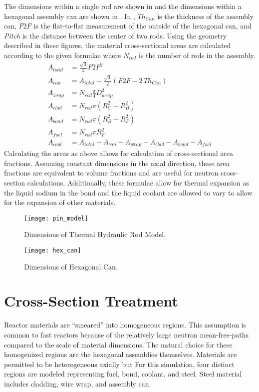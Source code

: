   The dimensions within a single rod are shown in  and the
  dimensions within a hexagonal assembly can are shown in . In
  , $T\!h_{Can}$ is the thickness of the assembly can,
  $F\!2\!F$ is the flat-to-flat measurement of the outside of the hexagonal can,
  and \textit{Pitch} is the distance between the center of two rods.
  Using the geometry described in 
  these figures, the material cross-sectional areas are calculated according to 
  the given formulae where $N_{rod}$ is the number of rods in the assembly.
  \begin{align}
    \label{eq:afrac_first}
    A_{total} &= \frac{\sqrt{3}}{2} F\!2\!F^2 \\
    A_{can} &= A_{total} - 
      \frac{\sqrt{3}}{2} \left(  F\!2\!F - 2 \, T\!h_{Can} \right) \\
    A_{wrap} &= N_{rod} \frac{\pi}{4} D_{wrap}^2 \\
    A_{clad} &= N_{rod} \pi (R_C^2 - R_B^2) \\
    A_{bond} &= N_{rod} \pi (R_B^2 - R_F^2) \\
    A_{fuel} &= N_{rod} \pi R_F^2 \\
    \label{eq:afrac_last}
    A_{cool} &= A_{total} - A_{can} - A_{wrap} - A_{clad} - A_{bond} - A_{fuel}
  \end{align}
  Calculating the areas as above allows for calculation of cross-sectional area
  fractions. Assuming constant dimensions in the axial
  direction, these area fractions are equivalent to volume fractions and are
  useful for neutron cross-section calculations. Additionally, these formulae
  allow for thermal expansion as the liquid sodium in the bond and
  the liquid coolant are allowed to vary to allow for the expansion of other 
  materials.

  \begin{figure}
    \centering
    \texttt{[image: pin\_model]}
    \caption{Dimensions of Thermal Hydraulic Rod Model.}
    \label{fig:pin_model}
  \end{figure}

  \begin{figure}
    \centering
    \texttt{[image: hex\_can]}
    \caption{Dimensions of Hexagonal Can.}
    \label{fig:hex_can}
  \end{figure}

\section{Cross-Section Treatment}
  \label{sec:cross_section_treatment}
  Reactor materials are ``smeared'' into homogeneous regions. This assumption is 
  common to fast reactors because of the relatively large neutron 
  mean-free-paths compared to the scale of material dimensions. 
  The natural choice for these homogenized regions are the hexagonal
  assemblies themselves. Materials are permitted to be heterogeneous axially but
  For this simulation, four distinct regions are modeled representing fuel, 
  bond, coolant, and steel. Steel material includes cladding, wire wrap, and 
  assembly can. 

